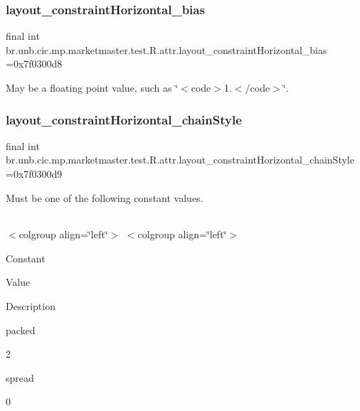 \subsubsection{\texorpdfstring{layout\+\_\+constraint\+Horizontal\+\_\+bias}{layout\_constraintHorizontal\_bias}}
{\footnotesize\ttfamily final int br.\+unb.\+cic.\+mp.\+marketmaster.\+test.\+R.\+attr.\+layout\+\_\+constraint\+Horizontal\+\_\+bias =0x7f0300d8\hspace{0.3cm}{\ttfamily [static]}}

May be a floating point value, such as \char`\"{}$<$code$>$1.$<$/code$>$\char`\"{}. \mbox{\label{classbr_1_1unb_1_1cic_1_1mp_1_1marketmaster_1_1test_1_1R_1_1attr_a1c92b22eee1481d1447f7e0020e1d001}} 
\subsubsection{\texorpdfstring{layout\+\_\+constraint\+Horizontal\+\_\+chain\+Style}{layout\_constraintHorizontal\_chainStyle}}
{\footnotesize\ttfamily final int br.\+unb.\+cic.\+mp.\+marketmaster.\+test.\+R.\+attr.\+layout\+\_\+constraint\+Horizontal\+\_\+chain\+Style =0x7f0300d9\hspace{0.3cm}{\ttfamily [static]}}

Must be one of the following constant values.

\tabulinesep=1mm
\begin{longtabu} spread 0pt [c]{*{0}{|X[-1]}|}
\hline
\end{longtabu}
$<$colgroup align=\char`\"{}left\char`\"{}$>$ $<$colgroup align=\char`\"{}left\char`\"{}$>$ 

Constant

Value

Description 

packed

2

spread

0


